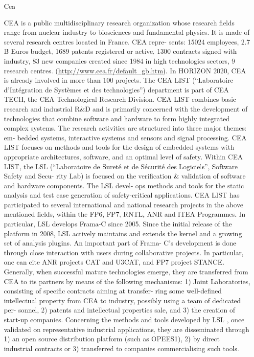 \begin{sitedescription}{Cea}



CEA is a public multidisciplinary research organization whose research fields
range from nuclear industry to biosciences and fundamental physics. It is made
of several research centres located in France. CEA repre- sents: 15024
employees, 2.7 B Euros budget, 1689 patents registered or active, 1300 contracts
signed with industry, 83 new companies created since 1984 in high technologies
sectors, 9 research centres. (\url{http://www.cea.fr/default_gb.htm}). In HORIZON
2020, CEA is already involved in more than 100 projects. The CEA LIST
(“Laboratoire d'Intégration de Systèmes et des technologies”) department is part
of CEA TECH, the CEA Technological Research Division. CEA LIST combines basic
research and industrial R\&D and is primarily concerned with the development of
technologies that combine software and hardware to form highly integrated
complex systems. The research activities are structured into three major themes:
em- bedded systems, interactive systems and sensors and signal processing. CEA
LIST focuses on methods and tools for the design of embedded systems with
appropriate architectures, software, and an optimal level of safety. Within CEA
LIST, the LSL (“Laboratoire de Sureté et de Sécurité des Logiciels”, Software
Safety and Secu- rity Lab) is focused on the verification \& validation of
software and hardware components. The LSL devel- ops methods and tools for the
static analysis and test case generation of safety-critical applications. CEA
LIST has participated to several international and national research projects in
the above mentioned fields, within the FP6, FP7, RNTL, ANR and ITEA Programmes.
In particular, LSL develops Frama-C since 2005. Since the initial release of the
platform in 2008, LSL actively maintains and extends the kernel and a growing
set of analysis plugins. An important part of Frama- C's development is done
through close interaction with users during collaborative projects. In
particular, one can cite ANR projects CAT and U3CAT, and FP7 project STANCE.
Generally, when successful mature technologies emerge, they are transferred from
CEA to its partners by means of the following mechanisms: 1) Joint Laboratories,
consisting of specific contracts aiming at transfer- ring some well-defined
intellectual property from CEA to industry, possibly using a team of dedicated
per- sonnel, 2) patents and intellectual properties sale, and 3) the creation of
start-up companies. Concerning the methods and tools developed by LSL , once
validated on representative industrial applications, they are disseminated
through 1) an open source distribution platform (such as OPEES1), 2) by direct
industrial contracts or 3) transferred to companies commercialising such tools.


\end{sitedescription}
